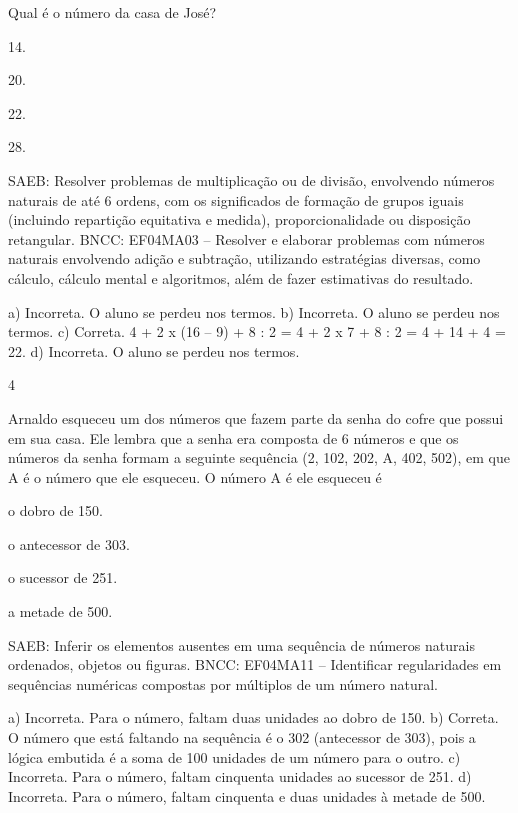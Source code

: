 \begin{mdframed}[linewidth=2pt,linecolor=salmao,roundcorner=2pt]
\begin{escolha}
{\begin{escolha}
Qual é o número da casa de José?

\begin{escolha}
\item
  14.
\item
  20.
\item
  22.
\item
  28.
\end{escolha}

SAEB: Resolver problemas de multiplicação ou de divisão, envolvendo números
naturais de até 6 ordens, com os significados de formação de grupos
iguais (incluindo repartição equitativa e medida), proporcionalidade ou
disposição retangular.
BNCC: EF04MA03 -- Resolver e elaborar problemas com números naturais envolvendo adição e subtração,
utilizando estratégias diversas, como cálculo, cálculo mental e algoritmos, além de fazer estimativas
do resultado.

a) Incorreta. O aluno se perdeu nos termos.
b) Incorreta. O aluno se perdeu nos termos.
c) Correta. 4 + 2 x (16 -- 9) + 8 : 2 = 4 + 2 x 7 + 8 : 2 = 4 + 14 + 4 = 22.
d) Incorreta. O aluno se perdeu nos termos.

\num{4}

Arnaldo esqueceu um dos números que fazem parte da senha do cofre que
possui em sua casa. Ele lembra que a senha era composta de 6 números e
que os números da senha formam a seguinte sequência (2, 102, 202,
A, 402, 502), em que A é o número que ele esqueceu. O número A é
ele esqueceu é

\begin{escolha}
\item
  o dobro de 150.
\item
  o antecessor de 303.
\item
  o sucessor de 251.
\item
  a metade de 500.
\end{escolha}

SAEB: Inferir os elementos ausentes em uma sequência de
números naturais ordenados, objetos ou figuras.
BNCC: EF04MA11 -- Identificar regularidades em sequências numéricas compostas por múltiplos de um
número natural.

a) Incorreta. Para o número, faltam duas unidades ao dobro de 150.
b) Correta. O número que está faltando na sequência é o 302 (antecessor de 303),
pois a lógica embutida é a soma de 100 unidades de um número para o
outro.
c) Incorreta. Para o número, faltam cinquenta unidades ao sucessor de 251.
d) Incorreta. Para o número, faltam cinquenta e duas unidades à metade de 500.


\end{escolha}}
\end{escolha}
\end{mdframed}
